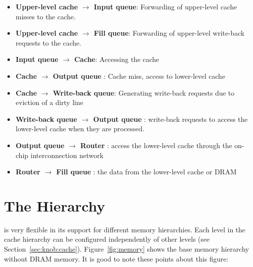 \begin{itemize}

  \item \textbf{Upper-level cache $\rightarrow$ Input queue}: Forwarding of upper-level cache misses
		to the cache.

  \item \textbf{Upper-level cache $\rightarrow$ Fill queue}: Forwarding of upper-level write-back 
		requests to the cache.

  \item \textbf{Input queue $\rightarrow$ Cache}: Accessing the cache

  \item \textbf{Cache $\rightarrow$ Output queue} : Cache miss, access to lower-level cache

  \item \textbf{Cache $\rightarrow$ Write-back queue}: Generating write-back requests due to
		eviction of a dirty line

  \item \textbf{Write-back queue $\rightarrow$ Output queue} : write-back requests to access the
		lower-level cache when they are processed.

  \item \textbf{Output queue $\rightarrow$ Router} : access the lower-level cache
		through the on-chip interconnection network

  \item \textbf{Router $\rightarrow$ Fill queue} : the data from the lower-level cache
		or DRAM

\end{itemize}

\section{The Hierarchy}
\label{sec:memhierarchy}

\SIM is very flexible in its support for different memory
hierarchies. Each level in the cache hierarchy can be configured
independently of other levels (see Section~\ref{sec:knob:cache}).
Figure~\ref{fig:memory} shows the base memory hierarchy without DRAM
memory. It is good to note these points about this figure: 

